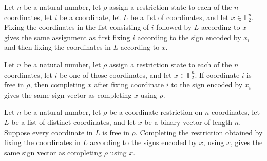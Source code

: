 \begin{theorem}
\label{FABL.CoordRestriction.fixCoordinateList_cons}
\leanok
{}
Let $n$ be a natural number, let $\rho$ assign a restriction state to each of the $n$
coordinates, let $i$ be a coordinate, let $L$ be a list of coordinates, and let
$x\in\mathbb{F}_2^n$. Fixing the coordinates in the list consisting of $i$ followed by
$L$ according to $x$ gives the same assignment as first fixing $i$ according to the sign
encoded by $x_i$ and then fixing the coordinates in $L$ according to $x$.
\end{theorem}

\begin{theorem}
\label{FABL.CoordRestriction.complete_fixCoordinate_signEncode}
\leanok
{}
Let $n$ be a natural number, let $\rho$ assign a restriction state to each of the $n$
coordinates, let $i$ be one of those coordinates, and let $x\in\mathbb{F}_2^n$. If
coordinate $i$ is free in $\rho$, then completing $x$ after fixing coordinate $i$ to the
sign encoded by $x_i$ gives the same sign vector as completing $x$ using $\rho$.
\end{theorem}

\begin{theorem}
\label{FABL.CoordRestriction.complete_fixCoordinateList}
\leanok
{}
Let $n$ be a natural number, let $\rho$ be a coordinate restriction on $n$ coordinates,
let $L$ be a list of distinct coordinates, and let $x$ be a binary vector of length $n$.
Suppose every coordinate in $L$ is free in $\rho$. Completing the restriction obtained
by fixing the coordinates in $L$ according to the signs encoded by $x$, using $x$, gives
the same sign vector as completing $\rho$ using $x$.
\end{theorem}

